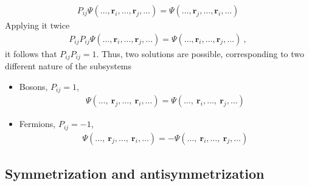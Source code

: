 \documentclass[letterpaper,10pt,english]{jupyterBook}
\begin{document}
\begin{equation*}
\begin{split}P_{ij} \Psi( \dots, \mathbf{r}_i, \dots, \mathbf{r}_j, \dots ) = \Psi( \dots, \mathbf{r}_j, \dots, \mathbf{r}_i, \dots )\end{split}
\end{equation*}
\sphinxAtStartPar
Applying it twice
\begin{equation*}
\begin{split}P_{ij} P_{ij} \Psi( \dots, \mathbf{r}_i, \dots, \mathbf{r}_j, \dots ) = \Psi( \dots, \mathbf{r}_i, \dots, \mathbf{r}_j, \dots ) \ ,\end{split}
\end{equation*}
\sphinxAtStartPar
it follows that \(P_{ij} P_{ij} = 1\). Thus, two solutions are possible, corresponding to two different nature of the subsystems
\begin{itemize}
\item {} 
\sphinxAtStartPar
Bosons, \(P_{ij} = 1\),
\begin{equation*}
\begin{split}\Psi(\dots, \ \mathbf{r}_j, \dots, \ \mathbf{r}_i, \dots) = \Psi(\dots, \ \mathbf{r}_i, \dots, \ \mathbf{r}_j, \dots)\end{split}
\end{equation*}
\item {} 
\sphinxAtStartPar
Fermions, \(P_{ij} = -1\),
\begin{equation*}
\begin{split}\Psi(\dots, \ \mathbf{r}_j, \dots, \ \mathbf{r}_i, \dots) = - \Psi(\dots, \ \mathbf{r}_i, \dots, \ \mathbf{r}_j, \dots)\end{split}
\end{equation*}
\end{itemize}


\subsection{Symmetrization and anti\sphinxhyphen{}symmetrization}
\label{\detokenize{ch/quantum-mechanics/many-body/identical-systems:symmetrization-and-anti-symmetrization}}\label{\detokenize{ch/quantum-mechanics/many-body/identical-systems:quantum-mechanics-second-quantizazion-identical-symmetrization}}
\end{document}
